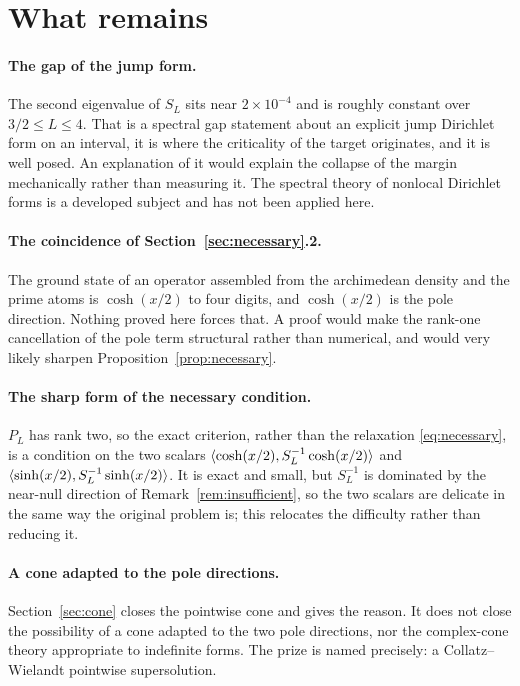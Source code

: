 \section{What remains}\label{sec:outlook}
\paragraph{The gap of the jump form.} The second eigenvalue of $S_L$ sits near
$2\times10^{-4}$ and is roughly constant over $3/2\leq L\leq4$. That is a
spectral gap statement about an explicit jump Dirichlet form on an interval, it
is where the criticality of the target originates, and it is well posed. An
explanation of it would explain the collapse of the margin mechanically rather
than measuring it. The spectral theory of nonlocal Dirichlet forms is a
developed subject and has not been applied here.

\paragraph{The coincidence of Section~\ref{sec:necessary}.2.} The ground state
of an operator assembled from the archimedean density and the prime atoms is
$\cosh(x/2)$ to four digits, and $\cosh(x/2)$ is the pole direction. Nothing
proved here forces that. A proof would make the rank-one cancellation of the
pole term structural rather than numerical, and would very likely sharpen
Proposition~\ref{prop:necessary}.

\paragraph{The sharp form of the necessary condition.} $P_L$ has rank two, so
the exact criterion, rather than the relaxation \eqref{eq:necessary}, is a
condition on the two scalars $\langle \cosh(x/2),S_L^{-1}\cosh(x/2)\rangle$ and
$\langle \sinh(x/2),S_L^{-1}\sinh(x/2)\rangle$. It is exact and small, but $S_L^{-1}$ is
dominated by the near-null direction of Remark~\ref{rem:insufficient}, so the
two scalars are delicate in the same way the original problem is; this relocates
the difficulty rather than reducing it.

\paragraph{A cone adapted to the pole directions.} Section~\ref{sec:cone} closes
the pointwise cone and gives the reason. It does not close the possibility of a
cone adapted to the two pole directions, nor the complex-cone theory appropriate
to indefinite forms. The prize is named precisely: a Collatz--Wielandt pointwise
supersolution.

